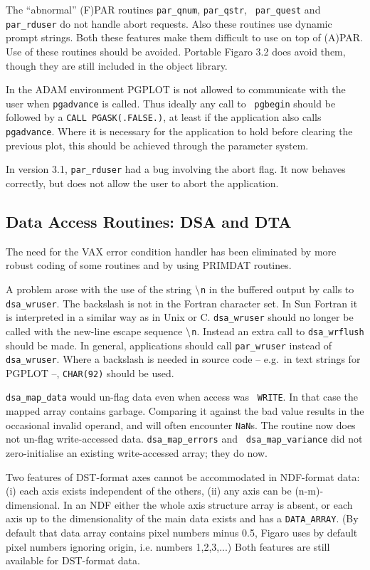 The ``abnormal'' (F)PAR routines {\tt par\_qnum}, {\tt par\_qstr}, {\tt
par\_quest} and {\tt par\_rduser} do not handle abort requests.  Also
these routines use dynamic prompt strings.  Both these features make
them difficult to use on top of (A)PAR.  Use of these routines should be
avoided.  Portable Figaro 3.2 does avoid them, though they are still
included in the object library.

In the ADAM environment PGPLOT is not allowed to communicate with the
user when {\tt pgadvance} is called.  Thus ideally any call to {\tt
pgbegin} should be followed by a {\tt CALL PGASK(.FALSE.)}, at least if
the application also calls {\tt pgadvance}.  Where it is necessary for
the application to hold before clearing the previous plot, this should
be achieved through the parameter system.

In version 3.1, {\tt par\_rduser} had a bug involving the abort flag.
It now behaves correctly, but does not allow the user to abort the
application.


\subsection{Data Access Routines: DSA and DTA}

The need for the VAX error condition handler has been eliminated by more
robust coding of some routines and by using PRIMDAT routines.

A problem arose with the use of the string {$\tt\backslash$\tt n} in the
buffered output by calls to {\tt dsa\_wruser}. The backslash is not in
the Fortran character set. In Sun Fortran it is interpreted in a similar
way as in Unix or C.  {\tt dsa\_wruser} should no longer be called with
the new-line escape sequence {$\tt\backslash$\tt n}. Instead an extra
call to {\tt dsa\_wrflush} should be made. In general, applications
should call {\tt par\_wruser} instead of {\tt dsa\_wruser}. Where a
backslash is needed in source code -- e.g.\ in text strings for PGPLOT
--, {\tt CHAR(92)} should be used.

{\tt dsa\_map\_data} would un-flag data even when access was {\tt
WRITE}. In that case the mapped array contains garbage. Comparing it
against the bad value results in the occasional invalid operand, and
will often encounter {\tt NaN}s. The routine now does not un-flag
write-accessed data.  {\tt dsa\_map\_errors} and {\tt
dsa\_map\_variance} did not zero-initialise an existing write-accessed
array; they do now.

Two features of DST-format axes cannot be accommodated in NDF-format
data: (i) each axis exists independent of the others, (ii) any axis can
be (n-m)-dimensional. In an NDF either the whole axis structure array is
absent, or each axis up to the dimensionality of the main data exists
and has a {\tt DATA\_ARRAY}. (By default that data array contains pixel
numbers minus 0.5, Figaro uses by default pixel numbers ignoring origin,
i.e. numbers 1,2,3,...)
Both features are still available for DST-format data.

